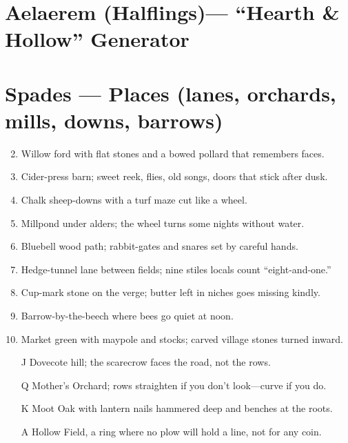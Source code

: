 \section{Aelaerem (Halflings)--- ``Hearth \& Hollow'' Generator}
\label{chap:aelaerem}

\section*{Spades --- Places (lanes, orchards, mills, downs, barrows)}
\label{sec:aelaerem-places}
\begin{enumerate}
\setcounter{enumi}{1}
\item Willow ford with flat stones and a bowed pollard that remembers faces.
\item Cider-press barn; sweet reek, flies, old songs, doors that stick after dusk.
\item Chalk sheep-downs with a turf maze cut like a wheel.
\item Millpond under alders; the wheel turns some nights without water.
\item Bluebell wood path; rabbit-gates and snares set by careful hands.
\item Hedge-tunnel lane between fields; nine stiles locals count ``eight-and-one.''
\item Cup-mark stone on the verge; butter left in niches goes missing kindly.
\item Barrow-by-the-beech where bees go quiet at noon.
\item Market green with maypole and stocks; carved village stones turned inward.
\item[J] Dovecote hill; the scarecrow faces the road, not the rows.
\item[Q] Mother's Orchard; rows straighten if you don't look---curve if you do.
\item[K] Moot Oak with lantern nails hammered deep and benches at the roots.
\item[A] Hollow Field, a ring where no plow will hold a line, not for any coin.
\end{enumerate}

